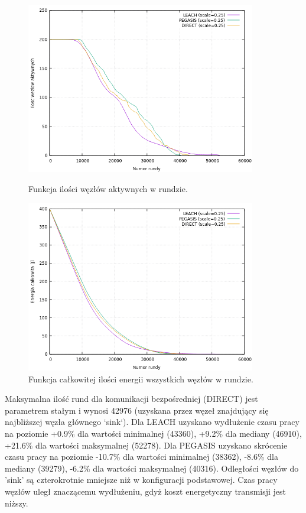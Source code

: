 \documentclass[a4paper,12pt,twoside,openany]{report}
\begin{document}
\begin{figure}[H]
 \centering
 \includegraphics[width=10cm]{images/gnuplot/test_3/nodes_in_round_xy050.png}
 \caption{Funkcja ilości węzłów aktywnych w rundzie.}
 \includegraphics[width=10cm]{images/gnuplot/test_3/energy_in_round_xy050.png}
 \caption{Funkcja całkowitej ilości energii wszystkich węzłów w rundzie.}
\end{figure}

\par
Maksymalna ilość rund dla komunikacji bezpośredniej (DIRECT) jest parametrem stałym i wynosi 42976 (uzyskana przez węzeł znajdujący się najbliższej węzła głównego `sink`).
Dla LEACH uzyskano wydłużenie czasu pracy na poziomie +0.9\% dla wartości minimalnej (43360), +9.2\% dla mediany (46910), +21.6\% dla wartości maksymalnej (52278).
Dla PEGASIS uzyskano skrócenie czasu pracy na poziomie -10.7\% dla wartości minimalnej (38362), -8.6\% dla mediany (39279), -6.2\% dla wartości maksymalnej (40316).
Odległości węzłów do 'sink' są czterokrotnie mniejsze niż w konfiguracji podstawowej. Czas pracy węzłów uległ znaczącemu wydłużeniu, gdyż koszt energetyczny transmisji jest niższy.
\end{document}
